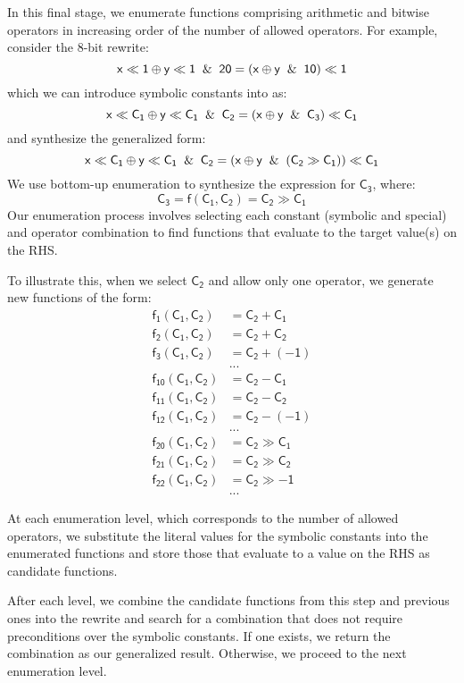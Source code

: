 \documentclass[review, anonymous, acmsmall]{acmart}
\newcommand{\blockmath}[1]{\[\mathsf{#1}\]}
\newcommand{\inline}[1]{$\mathsf{#1}$}
\begin{document}
In this final stage, we enumerate functions comprising arithmetic and bitwise operators in increasing order of the number of allowed operators. For example, consider the 8-bit rewrite:
\blockmath{x \ll 1 \oplus y \ll 1 \And 20 = (x \oplus y \And 10) \ll 1}
which we can introduce symbolic constants into as:
\blockmath{x \ll C_1 \oplus y \ll C_1 \And C_2 = (x \oplus y \And C_3) \ll C_1}
and synthesize the generalized form:
\blockmath{x \ll C_1 \oplus y \ll C_1 \And C_2 = (x \oplus y \And (C_2 \gg C_1)) \ll C_1}
We use bottom-up enumeration to synthesize the expression for \inline{C_3}, where:
\blockmath{C_3 = f(C_1, C_2) = C_2 \gg C_1}
Our enumeration process involves selecting each constant (symbolic and special) and operator combination to find functions that evaluate to the target value(s) on the RHS. 

To illustrate this, when we select \inline{C_2} and allow only one operator, we generate new functions of the form:
\begin{align*}
\mathsf{f_1(C_1, C_2)} &= \mathsf{C_2 + C_1} \\
\mathsf{f_2(C_1, C_2)} &= \mathsf{C_2 + C_2} \\
\mathsf{f_3(C_1, C_2)} &= \mathsf{C_2 + (-1)} \\
&... \\
\mathsf{f_{10}(C_1, C_2)} &= \mathsf{C_2 - C_1} \\
\mathsf{f_{11}(C_1, C_2)} &= \mathsf{C_2 - C_2} \\
\mathsf{f_{12}(C_1, C_2)} &= \mathsf{C_2 - (-1)} \\
&... \\
\mathsf{f_{20}(C_1, C_2)} &= \mathsf{C_2 \gg C_1} \\
\mathsf{f_{21}(C_1, C_2)} &= \mathsf{C_2 \gg C_2} \\
\mathsf{f_{22}(C_1, C_2)} &= \mathsf{C_2 \gg -1} \\
&...
\end{align*}

At each enumeration level, which corresponds to the number of allowed operators, we substitute the literal values for the symbolic constants into the enumerated functions and store those that evaluate to a value on the RHS as candidate functions. 

After each level, we combine the candidate functions from this step and previous ones into the rewrite and search for a combination that does not require preconditions over the symbolic constants. If one exists, we return the combination as our generalized result. Otherwise, we proceed to the next enumeration level. 
\end{document}
